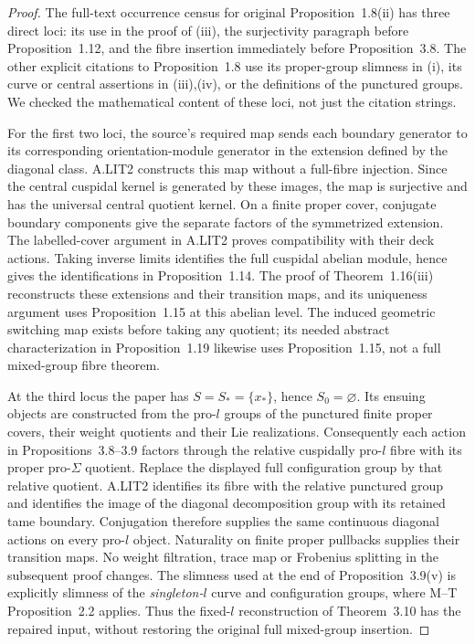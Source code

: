 \begin{proof}
The full-text occurrence census for original Proposition~1.8(ii)
has three direct loci: its use in the proof of (iii), the
surjectivity paragraph before Proposition~1.12, and the fibre
insertion immediately before Proposition~3.8. The other explicit
citations to Proposition~1.8 use its proper-group slimness in
(i), its curve or central assertions in (iii),(iv), or the
definitions of the punctured groups. We checked the mathematical
content of these loci, not just the citation strings.

For the first two loci, the source's required map sends each
boundary generator to its corresponding orientation-module
generator in the extension defined by the diagonal class.
A.LIT2 constructs this map without a full-fibre injection. Since
the central cuspidal kernel is generated by these images, the
map is surjective and has the universal central quotient kernel.
On a finite proper cover, conjugate boundary components give the
separate factors of the symmetrized extension. The labelled-cover
argument in A.LIT2 proves compatibility with their deck actions.
Taking inverse limits identifies the full cuspidal abelian
module, hence gives the identifications in Proposition~1.14.
The proof of Theorem~1.16(iii) reconstructs these extensions and
their transition maps, and its uniqueness argument uses
Proposition~1.15 at this abelian level. The induced geometric
switching map exists before taking any quotient; its needed
abstract characterization in Proposition~1.19 likewise uses
Proposition~1.15, not a full mixed-group fibre theorem.

At the third locus the paper has $S=S_* =\{x_*\}$, hence
$S_0=\varnothing$. Its ensuing objects are constructed from the
pro-$l$ groups of the punctured finite proper covers, their
weight quotients and their Lie realizations. Consequently each
action in Propositions~3.8--3.9 factors through the relative
cuspidally pro-$l$ fibre with its proper pro-$\Sigma$ quotient.
Replace the displayed full configuration group by that relative
quotient. A.LIT2 identifies its fibre with the relative
punctured group and identifies the image of the diagonal
decomposition group with its retained tame boundary. Conjugation
therefore supplies the same continuous diagonal actions on every
pro-$l$ object. Naturality on finite proper pullbacks supplies
their transition maps. No weight filtration, trace map or
Frobenius splitting in the subsequent proof changes. The
slimness used at the end of Proposition~3.9(v) is explicitly
slimness of the \emph{singleton-$l$} curve and configuration
groups, where M--T Proposition~2.2 applies. Thus the fixed-$l$
reconstruction of Theorem~3.10 has the repaired input, without
restoring the original full mixed-group insertion.


\end{proof}
